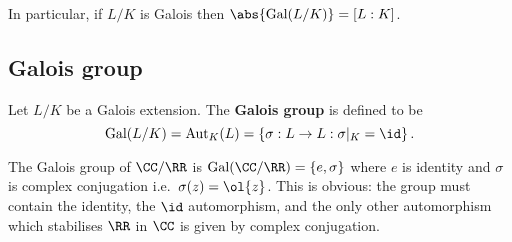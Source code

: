 \documentclass[12pt, a4paper]{article}
\newcommand{\aut}{\text{Aut}}
\newcommand{\gal}{\text{Gal}}
\begin{document}
\begin{mdremark}
    In particular, if \(L/K\) is Galois then \(\abs{\gal(L/K)}= [L:K]\).
\end{mdremark}

\subsection{Galois group}

\begin{definition}
    Let \(L/K\) be a Galois extension. The \textbf{Galois group} is defined to be 
    \[\gal(L/K)=\aut_K(L)=\left\{ \sigma : L \to L :\sigma\vert_K = \id \right\}.\]
\end{definition}

\begin{example}
    The Galois group of \(\CC/\RR\) is \(\gal(\CC/\RR) =\left\{ e,\sigma \right\}\) where \(e\) is identity and \(\sigma\) is complex conjugation i.e.\ \(\sigma(z)=\ol{z}\). This is obvious: the group must contain the identity, the \(\id\) automorphism, and the only other automorphism which stabilises \(\RR\) in \(\CC\) is given by complex conjugation.
\end{example}
\end{document}
